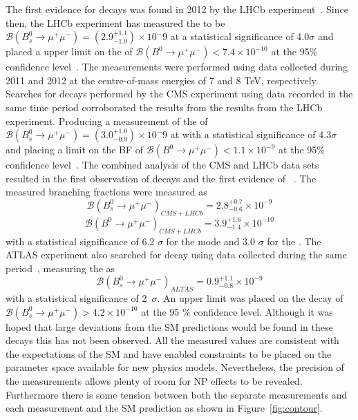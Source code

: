 The first evidence for \bsmumu decays was found in 2012 by the LHCb experiment~\cite{Aaij:2012nna}. Since then,
the LHCb experiment has measured the \bsmumu \BF to be $\mathcal{B}(B^{0}_{s} \to \mu^+ \mu^-) = (2.9^{+1.1}_{-1.0})\times 10^-9$ at a statistical significance of 4.0$\sigma$ and placed a upper limit on the \bdmumu \BF of $\mathcal{B}(B^{0} \to \mu^+ \mu^-) < 7.4 \times 10^{-10}$ at the 95$\%$ confidence level~\cite{Aaij:2013aka}. The measurements were performed using data collected during 2011 and 2012 at the centre-of-mass energies of 7 and 8 TeV, respectively. Searches for \bmumu decays performed by the CMS experiment using data recorded in the same time period corroborated the results from the results from the LHCb experiment. Producing a measurement of the \bsmumu \BF of $\mathcal{B}(B^{0}_{s} \to \mu^+ \mu^-) = (3.0^{+1.0}_{-0.9})\times 10^-9$ at with a statistical significance of 4.3$\sigma$ and placing a limit on the \bdmumu BF of $\mathcal{B}(B^{0} \to \mu^+ \mu^-) < 1.1 \times 10^{-9}$ at the 95$\%$ confidence level~\cite{Chatrchyan:2013bka}. 
The combined analysis of the CMS and LHCb data sets resulted in the first observation of \bsmumu decays and the first evidence of \bdmumu~\cite{CMS:2014xfa}. The measured branching fractions were measured as
\begin{equation}
\mathcal{B}(B^{0}_{s} \to \mu^+ \mu^-)_{CMS + LHCb}  = 2.8^{+0.7}_{-0.6} \times 10^{-9}
\end{equation}
\begin{equation}
\mathcal{B}(B^{0} \to \mu^+ \mu^-)_{CMS + LHCb}  = 3.9^{+1.6}_{-1.4} \times 10^{-10}
\end{equation}
with a statistical significance of 6.2 $\sigma$ for the \bs mode and 3.0 $\sigma$ for the \bd. The ATLAS experiment also searched for \bmumu decay using data collected during the same period~\cite{Aaboud:2016ire}, measuring the \bsmumu \BF as 
\begin{equation}
\mathcal{B}(B^{0}_{s} \to \mu^+ \mu^-)_{ALTAS}  = 0.9^{+1.1}_{-0.8} \times 10^{-9}
\end{equation}
with a statistical significance of 2~$\sigma$. An upper limit was placed on the \bdmumu decay of $\mathcal{B}(B^{0}_{s} \to \mu^+ \mu^-) >4.2 \times 10^{-10}$ at the 95 $\%$ confidence level.
Although it was hoped that large deviations from the SM predictions would be found in these decays this has not been observed. 
All the measured values are consistent with the expectations of the SM and have enabled constraints to be placed on the parameter space available for new physics models. Nevertheless, the precision of the measurements allows plenty of room for NP effects to be revealed. Furthermore there is some tension between both the separate measurements and each measurement and the SM prediction as shown in Figure~\ref{fig:contour}. 

